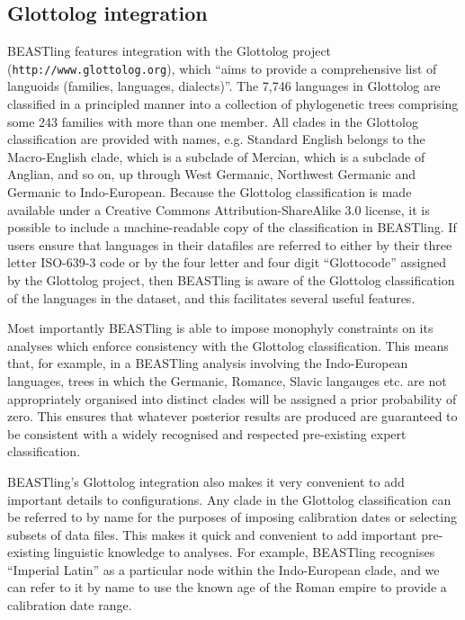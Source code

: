 \documentclass[twocolumn,10pt]{scrartcl}
\begin{document}
\subsection{Glottolog integration}

BEASTling features integration with the Glottolog project (\texttt{http://www.glottolog.org}), which ``aims to provide a comprehensive list of languoids (families, languages, dialects)''.  The 7,746 languages in Glottolog are classified in a principled manner into a collection of phylogenetic trees comprising some 243 families with more than one member.  All clades in the Glottolog classification are provided with names, e.g. Standard English belongs to the Macro-English clade, which is a subclade of Mercian, which is a subclade of Anglian, and so on, up through West Germanic, Northwest Germanic and Germanic to Indo-European.  Because the Glottolog classification is made available under a Creative Commons Attribution-ShareAlike 3.0 license, it is possible to include a machine-readable copy of the classification in BEASTling.  If users ensure that languages in their datafiles are referred to either by their three letter ISO-639-3 code or by the four letter and four digit ``Glottocode'' assigned by the Glottolog project, then BEASTling is aware of the Glottolog classification of the languages in the dataset, and this facilitates several useful features.

Most importantly BEASTling is able to impose monophyly constraints on its analyses which enforce consistency with the Glottolog classification.  This means that, for example, in a BEASTling analysis involving the Indo-European languages, trees in which the Germanic, Romance, Slavic langauges etc. are not appropriately organised into distinct clades will be assigned a prior probability of zero.  This ensures that whatever posterior results are produced are guaranteed to be consistent with a widely recognised and respected pre-existing expert classification.

BEASTling's Glottolog integration also makes it very convenient to add important details to configurations.  Any clade in the Glottolog classification can be referred to by name for the purposes of imposing calibration dates or selecting subsets of data files.  This makes it quick and convenient to add important pre-existing linguistic knowledge to analyses.  For example, BEASTling recognises ``Imperial Latin'' as a particular node within the Indo-European clade, and we can refer to it by name to use the known age of the Roman empire to provide a calibration date range.
\end{document}
